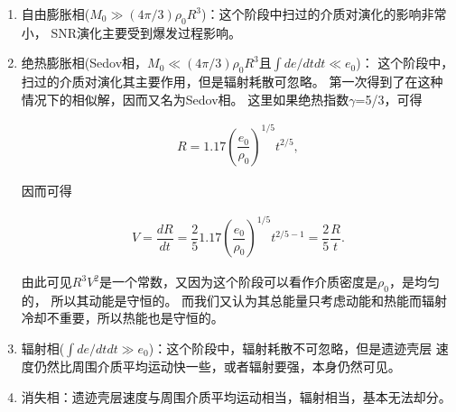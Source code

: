 \begin{enumerate}

    \item 自由膨胀相($M_0\gg(4\pi/3)\rho_0R^3$)：这个阶段中扫过的介质对演化的影响非常小，
    SNR演化主要受到爆发过程影响。

    \item 绝热膨胀相(Sedov相，$M_0\ll(4\pi/3)\rho_0R^3$且$\int de/dt dt\ll e_0$)：
    这个阶段中，扫过的介质对演化其主要作用，但是辐射耗散可忽略。
    \citet{1959sdmm.book.....S}第一次得到了在这种情况下的相似解，因而又名为Sedov相。
    这里如果绝热指数$\gamma$=5/3，可得

    \begin{equation}
      \begin{aligned}
        R = 1.17\left(\dfrac{e_0}{\rho_0}\right)^{1/5}t^{2/5},
      \end{aligned}
    \end{equation}

    因而可得

    \begin{equation}
      \begin{aligned}
        V = \dfrac{dR}{dt} = \dfrac{2}{5}1.17\left(\dfrac{e_0}{\rho_0}\right)^{1/5}t^{2/5-1} = \dfrac{2}{5}\dfrac{R}{t}.
      \end{aligned}
    \end{equation}

    由此可见$R^3V^2$是一个常数，又因为这个阶段可以看作介质密度是$\rho_0$，是均匀的，
    所以其动能是守恒的。
    而我们又认为其总能量只考虑动能和热能而辐射冷却不重要，所以热能也是守恒的。

    \item 辐射相($\int de/dt dt\gg e_0$)：这个阶段中，辐射耗散不可忽略，但是遗迹壳层
    速度仍然比周围介质平均运动快一些，或者辐射要强，本身仍然可见。

    \item 消失相：遗迹壳层速度与周围介质平均运动相当，辐射相当，基本无法却分。

\end{enumerate}

